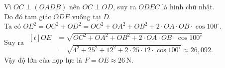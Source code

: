 \begin{vd}
{	}
	\noindent
	Vì $OC \perp (OADB)$ nên $OC \perp OD$, suy ra $ODEC$ là hình chữ nhật.\\
	Do đó tam giác $ODE$ vuông tại $D$.\\
	Ta có $OE^2=OC^2+OD^2=OC^2+OA^2+OB^2+2\cdot OA\cdot OB\cdot\cos 100^{\circ}$.\\
	Suy ra 
	$\begin{aligned}[t]
		OE
		&=\sqrt{OC^2+OA^2+OB^2+2\cdot OA\cdot OB\cdot\cos 100^{\circ}}\\
		&=\sqrt{4^2+25^2+12^2+2\cdot 25\cdot 12\cdot \cos 100^{\circ}} \approx 26{,}092.
	\end{aligned}$\\
	Vậy độ lớn của hợp lực là $F=OE \approx 26 \mathrm{\,N}$.
\end{vd}

